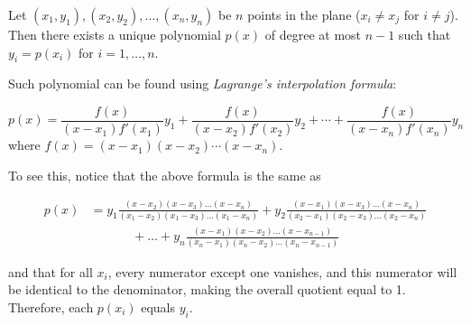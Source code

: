 \documentclass[12pt]{article}
\begin{document}
Let $(x_1,y_1), (x_2,y_2),\dotsc,(x_n,y_n)$ be $n$ points in the plane ($x_i\neq x_j$ for $i\neq j$). Then there exists a unique polynomial $p(x)$ of degree at most $n-1$ such that $y_i=p(x_i)$ for $i=1,\ldots,n$.

Such polynomial can be found using \emph{Lagrange's interpolation formula}:

\[
p(x)=\frac{f(x)}{(x-x_1)f'(x_1)}y_1+\frac{f(x)}{(x-x_2)f'(x_2)}y_2+\cdots+\frac{f(x)}{(x-x_n)f'(x_n)}y_n
\]
where $f(x)=(x-x_1)(x-x_2)\cdots(x-x_n)$.

To see this, notice that the above formula is the same as

\begin{align*}
 p(x) &=  y_1 \frac{(x-x_2)(x-x_3)\dots(x-x_n)}{(x_1-x_2)(x_1-x_3)\dots(x_1-x_n)} +
y_2 \frac{(x-x_1)(x-x_3)\dots(x-x_n)}{(x_2-x_1)(x_2-x_3)\dots(x_2-x_n)}\\
&\phantom{=}\qquad+\dots+y_n \frac{(x-x_1)(x-x_2)\dots(x-x_{n-1})}{(x_n-x_1)(x_n-x_2)\dots(x_n-x_{n-1})}
\end{align*}

and that for all $x_i$, every numerator except one vanishes, and this numerator will be identical to the denominator, making the overall quotient equal to 1.  Therefore, each $p(x_i)$ equals $y_i$.
\end{document}
